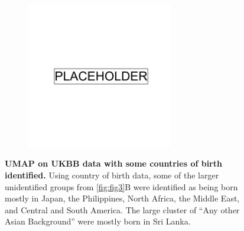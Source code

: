 \begin{figure}[ht]
    \centering
    \begin{subfigure}{0.8\textwidth}
    \includegraphics[width=0.7\textwidth]{placeholder.png}
    \end{subfigure}
    \caption[UMAP on UKBB data with some countries of birth identified]{\textbf{UMAP on UKBB data with some countries of birth identified.} Using country of birth data, some of the larger unidentified groups from \ref{fig:fig3}B were identified as being born mostly in Japan, the Philippines, North Africa, the Middle East, and Central and South America. The large cluster of ``Any other Asian Background'' were mostly born in Sri Lanka.}
    \label{fig:supp_ukbb_cob}
\end{figure}

\newpage


